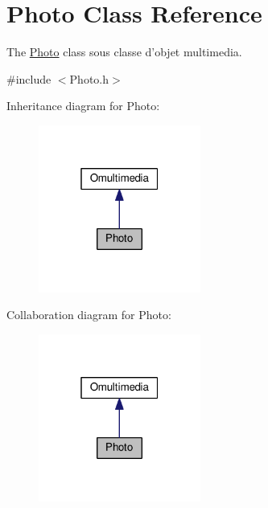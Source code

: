 \hypertarget{class_photo}{\section{Photo Class Reference}
\label{class_photo}
}


The \hyperlink{class_photo}{Photo} class sous classe d'objet multimedia.  




{\ttfamily \#include $<$Photo.\+h$>$}



Inheritance diagram for Photo\+:
\nopagebreak
\begin{figure}[H]
\begin{center}
\leavevmode
\includegraphics[width=151pt]{class_photo__inherit__graph}
\end{center}
\end{figure}


Collaboration diagram for Photo\+:
\nopagebreak
\begin{figure}[H]
\begin{center}
\leavevmode
\includegraphics[width=151pt]{class_photo__coll__graph}
\end{center}
\end{figure}
